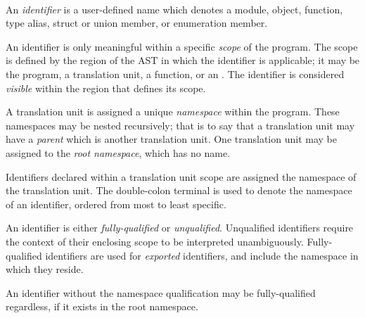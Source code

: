 
\begin{grammar}
\\
 \terminal{::} 
\end{grammar}


\specsubsubitem
An \textit{identifier} is a user-defined name which denotes a module, object,
function, type alias, struct or union member, or enumeration member.

\specsubsubitem
An identifier is only meaningful within a specific \textit{scope} of the
program. The scope is defined by the region of the AST in which the identifier
is applicable; it may be the program, a translation unit, a function, or an
. The identifier is considered \textit{visible}
within the region that defines its scope.

\specsubsubitem
A translation unit is assigned a unique \textit{namespace} within the program.
These namespaces may be nested recursively; that is to say that a translation
unit may have a \textit{parent} which is another translation unit. One
translation unit may be assigned to the \textit{root namespace}, which has no
name.

\specsubsubitem
Identifiers declared within a translation unit scope are assigned the namespace
of the translation unit. The double-colon terminal \terminal{::} is used to
denote the namespace of an identifier, ordered from most to least specific.

\specsubsubitem
An identifier is either \textit{fully-qualified} or \textit{unqualified}.
Unqualified identifiers require the context of their enclosing scope to be
interpreted unambiguously. Fully-qualified identifiers are used for
\textit{exported} identifiers, and include the namespace in which they reside.


\specsubsubitem
An identifier without the namespace qualification may be fully-qualified
regardless, if it exists in the root namespace.
